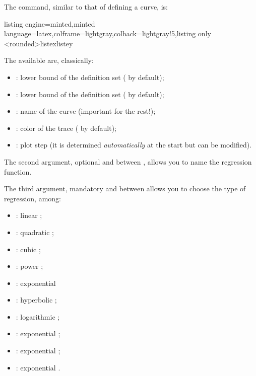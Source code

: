 \documentclass[11pt,a4paper]{ltxdoc}
\begin{document}
The command, similar to that of defining a curve, is:

\begin{tcblisting}{listing engine=minted,minted language=latex,colframe=lightgray,colback=lightgray!5,listing only}
<rounded>{listex}{listey}
\end{tcblisting}

The \MontreCode{[keys]} available are, classically:

\begin{itemize}
	\item {}: lower bound of the definition set ( by default);
	\item {}: lower bound of the definition set ( by default);
	\item {}: name of the curve (important for the rest!);
	\item {}: color of the trace ( by default);
	\item {}: plot step (it is determined \textit{automatically} at the start but can be modified).
\end{itemize}

\pagebreak

The second argument, optional and between , allows you to name the regression function.

The third argument, mandatory and between  allows you to choose the type of regression, among:

\begin{itemize}
	\item {}: linear ;
	\item {}: quadratic ;
	\item {}: cubic ;
	\item {}: power ;
	\item {}: exponential 
	\item {}: hyperbolic ;
	\item {}: logarithmic ;
	\item {}: exponential ;
	\item {}: exponential ;
	\item {}: exponential .
\end{itemize}
\end{document}
